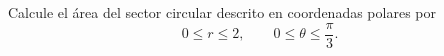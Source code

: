Calcule el área del sector circular descrito en coordenadas polares por
\[
0\leq r\leq2,\qquad 0\leq\theta\leq\frac{\pi}{3}.
\]
